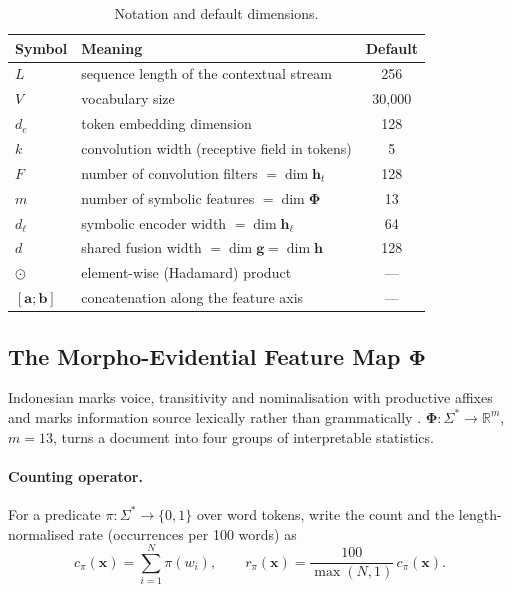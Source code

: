 \begin{table}[t]
\centering\small
\caption{Notation and default dimensions.}
\label{tab:notation}
\begin{tabular}{llc}
\toprule
Symbol & Meaning & Default \\
\midrule
$L$ & sequence length of the contextual stream & 256 \\
$V$ & vocabulary size & 30{,}000 \\
$d_e$ & token embedding dimension & 128 \\
$k$ & convolution width (receptive field in tokens) & 5 \\
$F$ & number of convolution filters $=\dim\mathbf{h}_t$ & 128 \\
$m$ & number of symbolic features $=\dim\bm{\Phi}$ & 13 \\
$d_\ell$ & symbolic encoder width $=\dim\mathbf{h}_\ell$ & 64 \\
$d$ & shared fusion width $=\dim\mathbf{g}=\dim\mathbf{h}$ & 128 \\
$\odot$ & element-wise (Hadamard) product & --- \\
$[\mathbf{a};\mathbf{b}]$ & concatenation along the feature axis & --- \\
\bottomrule
\end{tabular}
\end{table}

\subsection{The Morpho-Evidential Feature Map \texorpdfstring{$\bm{\Phi}$}{Phi}}
\label{sec:featuremap}

Indonesian marks voice, transitivity and nominalisation with productive affixes
\citep{sneddon2010indonesian} and marks information source lexically rather than grammatically
\citep{aikhenvald2004evidentiality}. $\bm{\Phi}:\Sigma^{*}\to\mathbb{R}^{m}$, $m=13$, turns a document into
four groups of interpretable statistics.

\paragraph{Counting operator.}
For a predicate $\pi:\Sigma^{*}\to\{0,1\}$ over word tokens, write the count and the length-normalised
rate (occurrences per 100 words) as
\begin{equation}
c_\pi(\mathbf{x})=\sum_{i=1}^{N}\pi(w_i),
\qquad
r_\pi(\mathbf{x})=\frac{100}{\max(N,1)}\,c_\pi(\mathbf{x}).
\label{eq:rate}
\end{equation}

